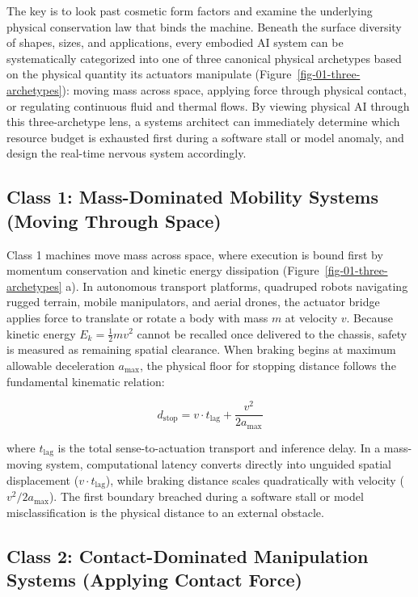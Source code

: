 \documentclass[
  10pt,
  letterpaper,
  twoside,
  openright,
  numbers=noenddot,
  headings=standardclasses
]{scrbook}
\begin{document}
The key is to look past cosmetic form factors and examine the underlying
physical conservation law that binds the machine. Beneath the surface
diversity of shapes, sizes, and applications, every embodied AI system
can be systematically categorized into one of three canonical physical
archetypes based on the physical quantity its actuators manipulate
(Figure~\ref{fig-01-three-archetypes}): moving mass across space,
applying force through physical contact, or regulating continuous fluid
and thermal flows. By viewing physical AI through this three-archetype
lens, a systems architect can immediately determine which resource
budget is exhausted first during a software stall or model anomaly, and
design the real-time nervous system accordingly.

\subsection{Class 1: Mass-Dominated Mobility Systems (Moving Through
Space)}\label{class-1-mass-dominated-mobility-systems-moving-through-space}

Class 1 machines move mass across space, where execution is bound first
by momentum conservation and kinetic energy dissipation
(Figure~\ref{fig-01-three-archetypes} a). In autonomous transport
platforms, quadruped robots navigating rugged terrain, mobile
manipulators, and aerial drones, the actuator bridge applies force to
translate or rotate a body with mass \(m\) at velocity \(v\). Because
kinetic energy \(E_k = \frac{1}{2}m v^2\) cannot be recalled once
delivered to the chassis, safety is measured as remaining spatial
clearance. When braking begins at maximum allowable deceleration
\(a_{\max}\), the physical floor for stopping distance follows the
fundamental kinematic relation:

\[d_{\text{stop}} = v \cdot t_{\text{lag}} + \frac{v^2}{2a_{\max}}\]

where \(t_{\text{lag}}\) is the total sense-to-actuation transport and
inference delay. In a mass-moving system, computational latency converts
directly into unguided spatial displacement
(\(v \cdot t_{\text{lag}}\)), while braking distance scales
quadratically with velocity (\(v^2 / 2a_{\max}\)). The first boundary
breached during a software stall or model misclassification is the
physical distance to an external obstacle.

\subsection{Class 2: Contact-Dominated Manipulation Systems (Applying
Contact
Force)}\label{class-2-contact-dominated-manipulation-systems-applying-contact-force}
\end{document}
